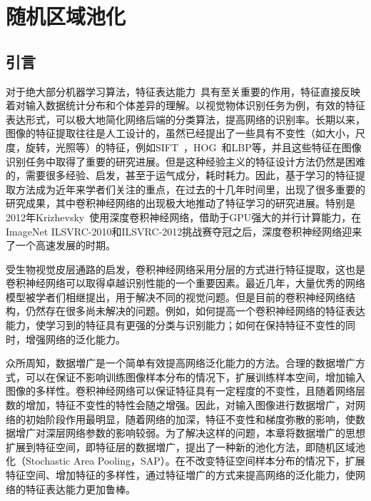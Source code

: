 \chapter{随机区域池化}
\label{cha:sap}

\section{引言}
\label{sec:sap:introduction}

对于绝大部分机器学习算法，特征表达能力~\cite{bengio2013representation}具有至关重要的作用，特征直接反映着对输入数据统计分布和个体差异的理解。以视觉物体识别任务为例，有效的特征表达形式，可以极大地简化网络后端的分类算法，提高网络的识别率。长期以来，图像的特征提取往往是人工设计的，虽然已经提出了一些具有不变性（如大小，尺度，旋转，光照等）的特征，例如SIFT~\cite{lowe1999object, ke2004pca,ke2004pca}，HOG~\cite{dalal2005histograms}和LBP等，并且这些特征在图像识别任务中取得了重要的研究进展。但是这种经验主义的特征设计方法仍然是困难的，需要很多经验、启发，甚至于运气成分，耗时耗力。因此，基于学习的特征提取方法成为近年来学者们关注的重点，在过去的十几年时间里，出现了很多重要的研究成果，其中卷积神经网络的出现极大地推动了特征学习的研究进展。特别是2012年Krizhevsky~\cite{krizhevsky2012imagenet}使用深度卷积神经网络，借助于GPU强大的并行计算能力，在ImageNet ILSVRC-2010和ILSVRC-2012挑战赛夺冠之后，深度卷积神经网络迎来了一个高速发展的时期。

受生物视觉皮层通路的启发，卷积神经网络采用分层的方式进行特征提取，这也是卷积神经网络可以取得卓越识别性能的一个重要因素。最近几年，大量优秀的网络模型被学者们相继提出，用于解决不同的视觉问题。但是目前的卷积神经网络结构，仍然存在很多尚未解决的问题。例如，如何提高一个卷积神经网络的特征表达能力，使学习到的特征具有更强的分类与识别能力；如何在保持特征不变性的同时，增强网络的泛化能力。


众所周知，数据増广是一个简单有效提高网络泛化能力的方法。合理的数据増广方式，可以在保证不影响训练图像样本分布的情况下，扩展训练样本空间，增加输入图像的多样性。卷积神经网络可以保证特征具有一定程度的不变性，且随着网络层数的增加，特征不变性的特性会随之增强。因此，对输入图像进行数据增广，对网络的初始阶段作用最明显，随着网络的加深，特征不变性和梯度弥散的影响，使数据增广对深层网络参数的影响较弱。为了解决这样的问题，本章将数据増广的思想扩展到特征空间，即特征层的数据増广，提出了一种新的池化方法，即随机区域池化（Stochastic Area Pooling，SAP）。在不改变特征空间样本分布的情况下，扩展特征空间、增加特征的多样性，通过特征増广的方式来提高网络的泛化能力，使网络的特征表达能力更加鲁棒。

